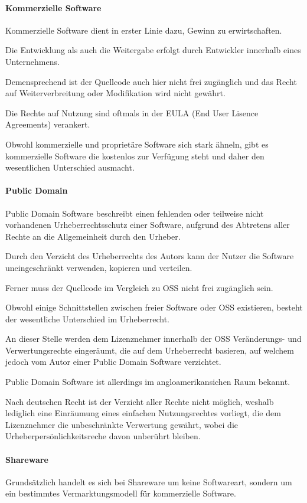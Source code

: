 \paragraph{Kommerzielle Software}
Kommerzielle Software dient in erster Linie dazu, Gewinn zu erwirtschaften. 

Die Entwicklung als auch die Weitergabe erfolgt durch Entwickler innerhalb eines Unternehmens. 

Demensprechend ist der Quellcode auch hier nicht frei zugänglich und das Recht auf Weiterverbreitung oder Modifikation wird nicht gewährt. 

Die Rechte auf Nutzung sind oftmals in der EULA (End User Lisence Agreements) verankert. 

Obwohl kommerzielle und proprietäre Software sich stark ähneln, gibt es kommerzielle Software die kostenlos zur Verfügung steht und daher den wesentlichen Unterschied ausmacht. 

\paragraph{Public Domain}
Public Domain Software beschreibt einen fehlenden oder teilweise nicht vorhandenen Urheberrechtsschutz einer Software, aufgrund des Abtretens aller Rechte an die Allgemeinheit durch den Urheber. 

Durch den Verzicht des Urheberrechts des Autors kann der Nutzer die Software uneingeschränkt verwenden, kopieren und verteilen. 

Ferner muss der Quellcode im Vergleich zu OSS nicht frei zugänglich sein. 

Obwohl einige Schnittstellen zwischen freier Software oder OSS existieren, besteht der wesentliche Unterschied im Urheberrecht. 

An dieser Stelle werden dem Lizenznehmer innerhalb der OSS Veränderungs- und Verwertungsrechte eingeräumt, die auf dem Urheberrecht basieren, auf welchem jedoch vom Autor einer Public Domain Software verzichtet. 

Public Domain Software ist allerdings im angloamerikansichen Raum bekannt. 

Nach deutschen Recht ist der Verzicht aller Rechte nicht möglich, weshalb lediglich eine Einräumung eines einfachen Nutzungsrechtes vorliegt, die dem Lizenznehmer die unbeschränkte Verwertung gewährt, wobei die Urheberpersönlichkeitsreche davon unberührt bleiben.  

\paragraph{Shareware}
Grundsätzlich handelt es sich bei Shareware um keine Softwareart, sondern um ein bestimmtes Vermarktungsmodell für kommerzielle Software.

